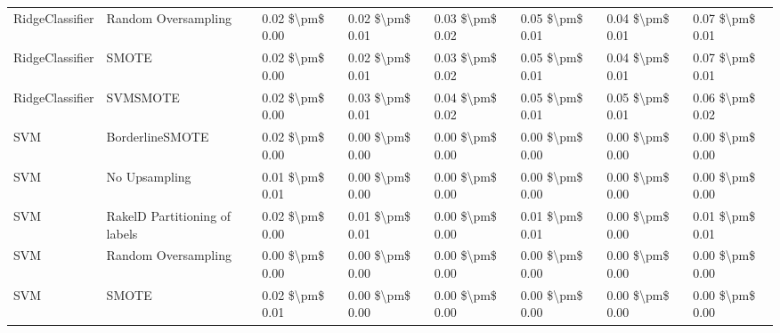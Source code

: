 \begin{tabular}{llllllll}
                RidgeClassifier &           Random Oversampling & 0.02 \$\textbackslash pm\$ 0.00 &           0.02 \$\textbackslash pm\$ 0.01 &       0.03 \$\textbackslash pm\$ 0.02 &        0.05 \$\textbackslash pm\$ 0.01 &                         0.04 \$\textbackslash pm\$ 0.01 &     0.07 \$\textbackslash pm\$ 0.01 \\
                RidgeClassifier &                         SMOTE & 0.02 \$\textbackslash pm\$ 0.00 &           0.02 \$\textbackslash pm\$ 0.01 &       0.03 \$\textbackslash pm\$ 0.02 &        0.05 \$\textbackslash pm\$ 0.01 &                         0.04 \$\textbackslash pm\$ 0.01 &     0.07 \$\textbackslash pm\$ 0.01 \\
                RidgeClassifier &                      SVMSMOTE & 0.02 \$\textbackslash pm\$ 0.00 &           0.03 \$\textbackslash pm\$ 0.01 &       0.04 \$\textbackslash pm\$ 0.02 &        0.05 \$\textbackslash pm\$ 0.01 &                         0.05 \$\textbackslash pm\$ 0.01 &     0.06 \$\textbackslash pm\$ 0.02 \\
                            SVM &               BorderlineSMOTE & 0.02 \$\textbackslash pm\$ 0.00 &           0.00 \$\textbackslash pm\$ 0.00 &       0.00 \$\textbackslash pm\$ 0.00 &        0.00 \$\textbackslash pm\$ 0.00 &                         0.00 \$\textbackslash pm\$ 0.00 &     0.00 \$\textbackslash pm\$ 0.00 \\
                            SVM &                 No Upsampling & 0.01 \$\textbackslash pm\$ 0.01 &           0.00 \$\textbackslash pm\$ 0.00 &       0.00 \$\textbackslash pm\$ 0.00 &        0.00 \$\textbackslash pm\$ 0.00 &                         0.00 \$\textbackslash pm\$ 0.00 &     0.00 \$\textbackslash pm\$ 0.00 \\
                            SVM & RakelD Partitioning of labels & 0.02 \$\textbackslash pm\$ 0.00 &           0.01 \$\textbackslash pm\$ 0.01 &       0.00 \$\textbackslash pm\$ 0.00 &        0.01 \$\textbackslash pm\$ 0.01 &                         0.00 \$\textbackslash pm\$ 0.00 &     0.01 \$\textbackslash pm\$ 0.01 \\
                            SVM &           Random Oversampling & 0.00 \$\textbackslash pm\$ 0.00 &           0.00 \$\textbackslash pm\$ 0.00 &       0.00 \$\textbackslash pm\$ 0.00 &        0.00 \$\textbackslash pm\$ 0.00 &                         0.00 \$\textbackslash pm\$ 0.00 &     0.00 \$\textbackslash pm\$ 0.00 \\
                            SVM &                         SMOTE & 0.02 \$\textbackslash pm\$ 0.01 &           0.00 \$\textbackslash pm\$ 0.00 &       0.00 \$\textbackslash pm\$ 0.00 &        0.00 \$\textbackslash pm\$ 0.00 &                         0.00 \$\textbackslash pm\$ 0.00 &     0.00 \$\textbackslash pm\$ 0.00 \\

\end{tabular}
